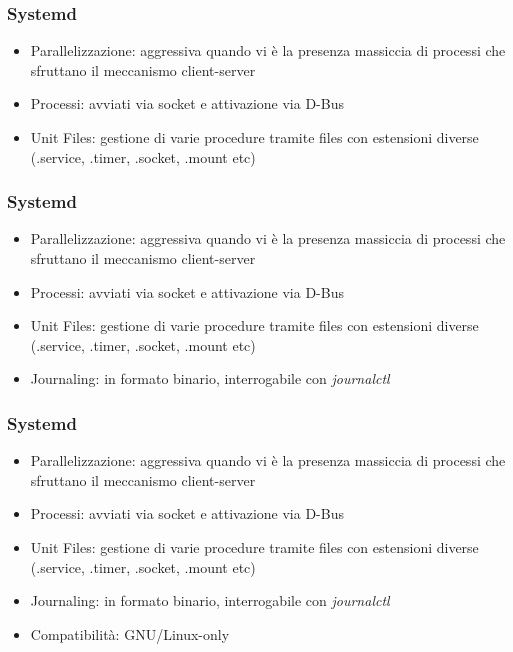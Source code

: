 \documentclass{beamer}
\begin{document}

\begin{frame}
	\frametitle{Systemd}
	\begin{itemize}
		\item Parallelizzazione: aggressiva quando vi \`e la presenza massiccia di processi che sfruttano il meccanismo client-server
		\item Processi: avviati via socket e attivazione via D-Bus
		\item Unit Files: gestione di varie procedure tramite files con estensioni diverse (.service, .timer, .socket, .mount etc)
	\end{itemize}
\end{frame}


\begin{frame}
	\frametitle{Systemd}
	\begin{itemize}
		\item Parallelizzazione: aggressiva quando vi \`e la presenza massiccia di processi che sfruttano il meccanismo client-server
		\item Processi: avviati via socket e attivazione via D-Bus
		\item Unit Files: gestione di varie procedure tramite files con estensioni diverse (.service, .timer, .socket, .mount etc)
		\item Journaling: in formato binario, interrogabile con \textit{journalctl}
	\end{itemize}
\end{frame}


\begin{frame}
	\frametitle{Systemd}
	\begin{itemize}
		\item Parallelizzazione: aggressiva quando vi \`e la presenza massiccia di processi che sfruttano il meccanismo client-server
		\item Processi: avviati via socket e attivazione via D-Bus
		\item Unit Files: gestione di varie procedure tramite files con estensioni diverse (.service, .timer, .socket, .mount etc)
		\item Journaling: in formato binario, interrogabile con \textit{journalctl}
		\item Compatibilit\`a: GNU/Linux-only
	\end{itemize}
\end{frame}
\end{document}
